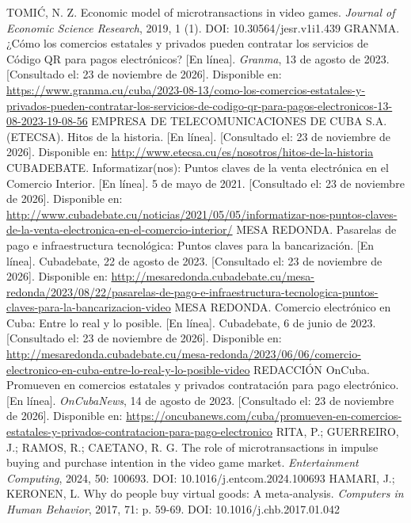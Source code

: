\documentclass[12pt]{article}
\makeatletter
\newcommand\onceUnoQuince{\fontsize{11bp}{14.5475bp}\selectfont}  %
\newenvironment{referencias}{%
  \list{\@biblabel{\@arabic\c@enumiv}}{%
    \settowidth\labelwidth{[99]}%
    \leftmargin\labelwidth \advance\leftmargin\labelsep
    \itemsep=4bp \parsep=0pt \topsep=0pt \partopsep=0pt
    \usecounter{enumiv}\let\p@enumiv\@empty
    \renewcommand\theenumiv{\@arabic\c@enumiv}}%
  \onceUnoQuince \sloppy}{\endlist}
\makeatother
\begin{document}
\begin{referencias}
 TOMIĆ, N. Z. Economic model of microtransactions in video games. \textit{Journal of Economic Science Research}, 2019, 1 (1). DOI: 10.30564/jesr.v1i1.439
 GRANMA. ¿Cómo los comercios estatales y privados pueden contratar los servicios de Código QR para pagos electrónicos? [En línea]. \textit{Granma}, 13 de agosto de 2023. [Consultado el: 23 de noviembre de 2026]. Disponible en: \url{https://www.granma.cu/cuba/2023-08-13/como-los-comercios-estatales-y-privados-pueden-contratar-los-servicios-de-codigo-qr-para-pagos-electronicos-13-08-2023-19-08-56}
 EMPRESA DE TELECOMUNICACIONES DE CUBA S.A. (ETECSA). Hitos de la historia. [En línea]. [Consultado el: 23 de noviembre de 2026]. Disponible en: \url{http://www.etecsa.cu/es/nosotros/hitos-de-la-historia}
 CUBADEBATE. Informatizar(nos): Puntos claves de la venta electrónica en el Comercio Interior. [En línea]. 5 de mayo de 2021. [Consultado el: 23 de noviembre de 2026]. Disponible en: \url{http://www.cubadebate.cu/noticias/2021/05/05/informatizar-nos-puntos-claves-de-la-venta-electronica-en-el-comercio-interior/}
 MESA REDONDA. Pasarelas de pago e infraestructura tecnológica: Puntos claves para la bancarización. [En línea]. Cubadebate, 22 de agosto de 2023. [Consultado el: 23 de noviembre de 2026]. Disponible en: \url{http://mesaredonda.cubadebate.cu/mesa-redonda/2023/08/22/pasarelas-de-pago-e-infraestructura-tecnologica-puntos-claves-para-la-bancarizacion-video}
 MESA REDONDA. Comercio electrónico en Cuba: Entre lo real y lo posible. [En línea]. Cubadebate, 6 de junio de 2023. [Consultado el: 23 de noviembre de 2026]. Disponible en: \url{http://mesaredonda.cubadebate.cu/mesa-redonda/2023/06/06/comercio-electronico-en-cuba-entre-lo-real-y-lo-posible-video}
 REDACCIÓN OnCuba. Promueven en comercios estatales y privados contratación para pago electrónico. [En línea]. \textit{OnCubaNews}, 14 de agosto de 2023. [Consultado el: 23 de noviembre de 2026]. Disponible en: \url{https://oncubanews.com/cuba/promueven-en-comercios-estatales-y-privados-contratacion-para-pago-electronico}
 RITA, P.; GUERREIRO, J.; RAMOS, R.; CAETANO, R. G. The role of microtransactions in impulse buying and purchase intention in the video game market. \textit{Entertainment Computing}, 2024, 50: 100693. DOI: 10.1016/j.entcom.2024.100693
 HAMARI, J.; KERONEN, L. Why do people buy virtual goods: A meta-analysis. \textit{Computers in Human Behavior}, 2017, 71: p. 59-69. DOI: 10.1016/j.chb.2017.01.042

\end{referencias}
\end{document}
